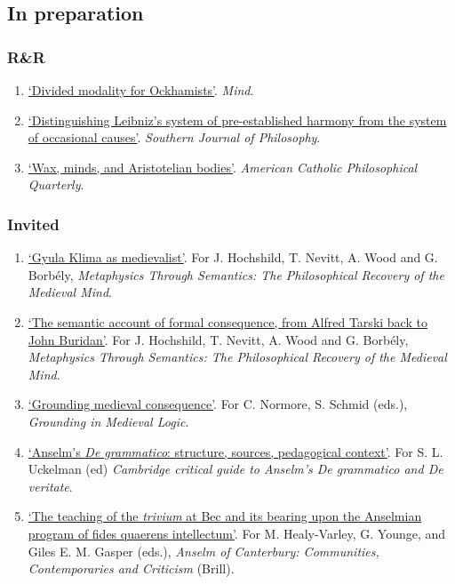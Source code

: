 \subsection{In preparation}
\subsubsection{R\&R}
\begin{enumerate}
	\setcounter{enumi}{\value{publicationCounter}}	%
	\item \datedsubsectionnarrow{}
	{}
	{
		\href{}{`Divided modality for Ockhamists'}. \emph{Mind}.}
	{}
	\item \datedsubsectionnarrow{}
{}
{
	\href{}{`Distinguishing Leibniz's system of pre-established harmony from the system of occasional causes'}. \emph{Southern Journal of Philosophy}.}
{}
	\item \datedsubsectionnarrow{}
{}
{
	\href{}{`Wax, minds, and Aristotelian bodies'}. \emph{American Catholic Philosophical Quarterly}.}
{}
	\setcounter{publicationCounter}{\value{enumi}}	%
\end{enumerate}
\subsubsection{Invited}
\begin{enumerate}
	\setcounter{enumi}{\value{publicationCounter}}	%
	\item \datedsubsectionnarrow{}
{}
{
	\href{}{`Gyula Klima as medievalist'}. For J. Hochshild, T. Nevitt, A. Wood and G. Borb\'{e}ly, \emph{Metaphysics Through Semantics: The Philosophical Recovery of the Medieval Mind}.}
{}
	\item \datedsubsectionnarrow{}
{}
{
	\href{}{`The semantic account of formal consequence, from Alfred Tarski back to John Buridan'}. For J. Hochshild, T. Nevitt, A. Wood and G. Borb\'{e}ly, \emph{Metaphysics Through Semantics: The Philosophical Recovery of the Medieval Mind}.}
{}
	\item \datedsubsectionnarrow{}
	{}
	{
		\href{}{`Grounding medieval consequence'}. For C. Normore, S. Schmid (eds.), \emph{Grounding in Medieval Logic}.}
	{}
	\item \datedsubsectionnarrow{}
	{}
	{
		\href{}{`Anselm's \emph{De grammatico}: structure, sources, pedagogical context'}. For S. L. Uckelman (ed) \emph{Cambridge critical guide to Anselm's De grammatico and De veritate}.}
	{}
	\item \datedsubsectionnarrow{}
	{}
	{
		\href{}{`The teaching of the \emph{trivium} at Bec and its bearing upon the Anselmian program of {fides quaerens intellectum}'}. For M. Healy-Varley, G. Younge, and Giles E. M. Gasper (eds.), \emph{Anselm of Canterbury: Communities, Contemporaries and Criticism} (Brill).}
	{}
	\setcounter{publicationCounter}{\value{enumi}}	%
\end{enumerate}

